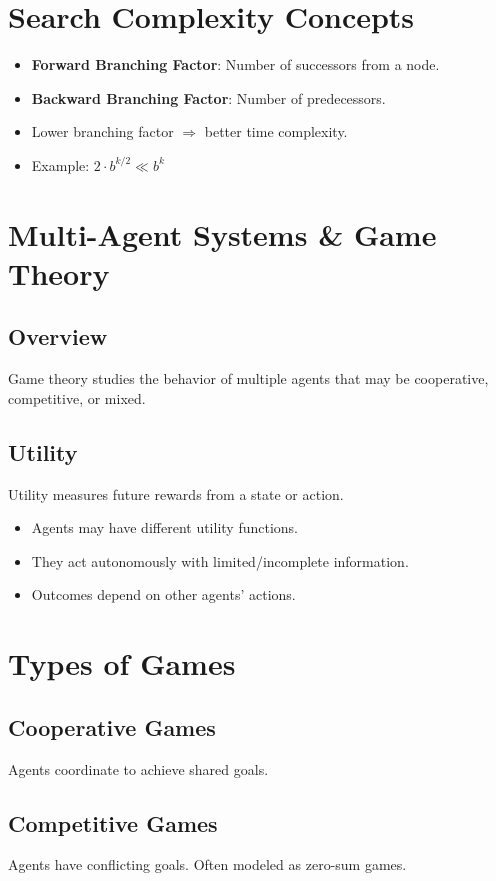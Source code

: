 \section{Search Complexity Concepts}
\begin{itemize}
    \item \textbf{Forward Branching Factor}: Number of successors from a node.
    \item \textbf{Backward Branching Factor}: Number of predecessors.
    \item Lower branching factor $\Rightarrow$ better time complexity.
    \item Example: $2 \cdot b^{k/2} \ll b^k$
\end{itemize}

\section{Multi-Agent Systems \& Game Theory}

\subsection{Overview}
Game theory studies the behavior of multiple agents that may be cooperative, competitive, or mixed.

\subsection{Utility}
Utility measures future rewards from a state or action.
\begin{itemize}
    \item Agents may have different utility functions.
    \item They act autonomously with limited/incomplete information.
    \item Outcomes depend on other agents’ actions.
\end{itemize}

\section{Types of Games}

\subsection{Cooperative Games}
Agents coordinate to achieve shared goals.

\subsection{Competitive Games}
Agents have conflicting goals. Often modeled as zero-sum games.

